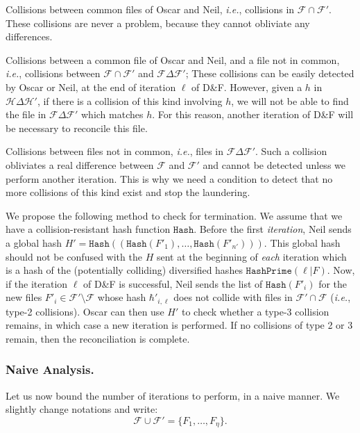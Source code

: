 \documentclass[twoside,envcountsame,runningheads]{llncs}
\newcommand{\Set}{\mathcal{H}}
\newcommand{\Files}{\mathcal{F}}
\newcommand{\df}{D\&F\xspace}
\newcommand{\ie}{\textit{i.e.}\xspace}
\newcommand{\Hash}{\ensuremath{\mathtt{Hash}}}
\newcommand{\HashPrime}{\ensuremath{\mathtt{HashPrime}}}
\begin{document}
\begin{compactenum}
\item Collisions between common files of Oscar and Neil, \ie, collisions in $\Files \cap \Files'$. These collisions are never a problem, because they cannot obliviate any differences.
\item Collisions between a common file of Oscar and Neil, and a file not in common, \ie, collisions between $\Files \cap \Files'$ and $\Files \Delta \Files'$;
These collisions can be easily detected by Oscar or Neil, at the end of iteration $\ell$ of \df. 
However, given a $h$ in $\Set \Delta \Set'$, if there is a collision of this kind involving $h$, we will not be able to find the file in $\Files \Delta \Files'$ which matches $h$. For this reason, another iteration of \df will be necessary to reconcile this file.
\item Collisions between files not in common, \ie, files in $\Files \Delta \Files'$.
  Such a collision obliviates a real difference between $\Files$ and $\Files'$ and cannot be detected unless we perform another iteration. This is why we need a condition to detect that no more collisions of this kind exist and stop the laundering.
\end{compactenum}

We propose the following method to check for termination. We assume that we have a collision-resistant hash function $\Hash$.
Before the first \emph{iteration}, Neil sends a global hash $H' = \Hash((\Hash(F'_1),\dots,\Hash(F'_{n'})))$.
This global hash should not be confused with the $H$ sent at the beginning of \emph{each} iteration which is a hash of the (potentially colliding) diversified hashes $ \HashPrime(\ell|F)$.
Now, if the iteration $\ell$ of \df is successful, Neil sends the list of $\Hash(F'_i)$ for the new files $F'_i \in \Files' \setminus \Files$ whose hash $\hbar'_{i,\ell}$ does not collide with files in $\Files' \cap \Files$ (\ie, type-2 collisions).
Oscar can then use $H'$ to check whether a type-3 collision remains, in which case a new iteration is performed. If no collisions of type 2 or 3 remain, then the reconciliation is complete.

\subsubsection{Naive Analysis.}

Let us now bound the number of iterations to perform, in a naive manner.
We slightly change notations and write:
\[ \Files \cup \Files' = \{ F_1, \dots, F_\eta \}. \]
\end{document}
